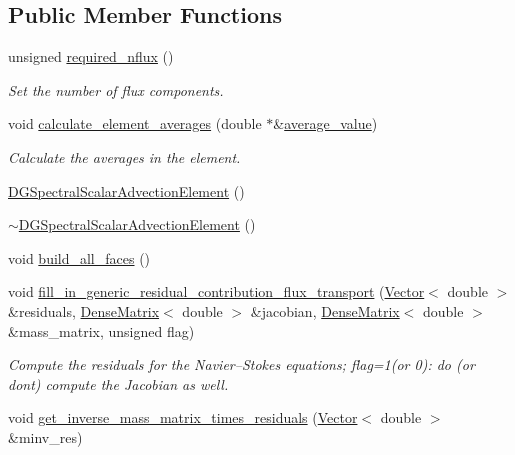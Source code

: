 \subsection*{Public Member Functions}
\begin{DoxyCompactItemize}
\item 
unsigned \hyperlink{classoomph_1_1DGSpectralScalarAdvectionElement_3_011_00_01NNODE__1D_01_4_a0966bfa51ec4e244580be3212c1db919}{required\+\_\+nflux} ()
\begin{DoxyCompactList}\small\item\em Set the number of flux components. \end{DoxyCompactList}\item 
void \hyperlink{classoomph_1_1DGSpectralScalarAdvectionElement_3_011_00_01NNODE__1D_01_4_a39a30e2966dde6acf1eb44d58ce0013a}{calculate\+\_\+element\+\_\+averages} (double $\ast$\&\hyperlink{classoomph_1_1DGElement_a9349e3c349f9cf3b25bcb6121e86a7f2}{average\+\_\+value})
\begin{DoxyCompactList}\small\item\em Calculate the averages in the element. \end{DoxyCompactList}\item 
\hyperlink{classoomph_1_1DGSpectralScalarAdvectionElement_3_011_00_01NNODE__1D_01_4_a15a0f59b87fb1eb728ba943b52509ed2}{D\+G\+Spectral\+Scalar\+Advection\+Element} ()
\item 
\hyperlink{classoomph_1_1DGSpectralScalarAdvectionElement_3_011_00_01NNODE__1D_01_4_a4a3ab08fb4a06976a07c6cf8df7affb5}{$\sim$\+D\+G\+Spectral\+Scalar\+Advection\+Element} ()
\item 
void \hyperlink{classoomph_1_1DGSpectralScalarAdvectionElement_3_011_00_01NNODE__1D_01_4_ac52a57b0eb393440d0a182260cfc1ce3}{build\+\_\+all\+\_\+faces} ()
\item 
void \hyperlink{classoomph_1_1DGSpectralScalarAdvectionElement_3_011_00_01NNODE__1D_01_4_ac24a1132d34b1062498ebf6010379017}{fill\+\_\+in\+\_\+generic\+\_\+residual\+\_\+contribution\+\_\+flux\+\_\+transport} (\hyperlink{classoomph_1_1Vector}{Vector}$<$ double $>$ \&residuals, \hyperlink{classoomph_1_1DenseMatrix}{Dense\+Matrix}$<$ double $>$ \&jacobian, \hyperlink{classoomph_1_1DenseMatrix}{Dense\+Matrix}$<$ double $>$ \&mass\+\_\+matrix, unsigned flag)
\begin{DoxyCompactList}\small\item\em Compute the residuals for the Navier--Stokes equations; flag=1(or 0)\+: do (or don\textquotesingle{}t) compute the Jacobian as well. \end{DoxyCompactList}\item 
void \hyperlink{classoomph_1_1DGSpectralScalarAdvectionElement_3_011_00_01NNODE__1D_01_4_af5e59ed30beabf17ae00ee64b19d8775}{get\+\_\+inverse\+\_\+mass\+\_\+matrix\+\_\+times\+\_\+residuals} (\hyperlink{classoomph_1_1Vector}{Vector}$<$ double $>$ \&minv\+\_\+res)
\end{DoxyCompactItemize}
